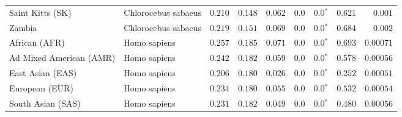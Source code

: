 \begin{center}
\begin{adjustbox}{width = 1\textwidth}
\begin{tabular}{|l|l|r|r|r|r|r|r|r|}
            Saint Kitts (SK)                  & Chlorocebus sabaeus        & $ 0.210$ & $ 0.148$ & $ 0.062$ & $0.0$ & $\bm{0.0{^*}}$ & $ 0.621$ & $ 0.001$ \\
            Zambia        & Chlorocebus sabaeus        & $ 0.219$ & $ 0.151$ & $ 0.069$ & $0.0$ & $\bm{0.0{^*}}$ & $ 0.684$ & $ 0.002$ \\
            African (AFR)               & Homo sapiens        & $ 0.257$ & $ 0.185$ & $ 0.071$ & $0.0$ & $\bm{0.0{^*}}$ & $ 0.693$ & $0.00071$ \\
            Ad Mixed American (AMR)                 & Homo sapiens        & $ 0.242$ & $ 0.182$ & $ 0.059$ & $0.0$ & $\bm{0.0{^*}}$ & $ 0.578$ & $0.00056$ \\
            East Asian (EAS)              & Homo sapiens        & $ 0.206$ & $ 0.180$ & $ 0.026$ & $0.0$ & $\bm{0.0{^*}}$ & $ 0.252$ & $0.00051$ \\
            European (EUR)              & Homo sapiens        & $ 0.234$ & $ 0.180$ & $ 0.055$ & $0.0$ & $\bm{0.0{^*}}$ & $ 0.532$ & $0.00054$ \\
            South Asian (SAS)              & Homo sapiens        & $ 0.231$ & $ 0.182$ & $ 0.049$ & $0.0$ & $\bm{0.0{^*}}$ & $ 0.480$ & $0.00056$ \\
            \bottomrule
        \end{tabular}
    \end{adjustbox}
    \newpage
\end{center}

